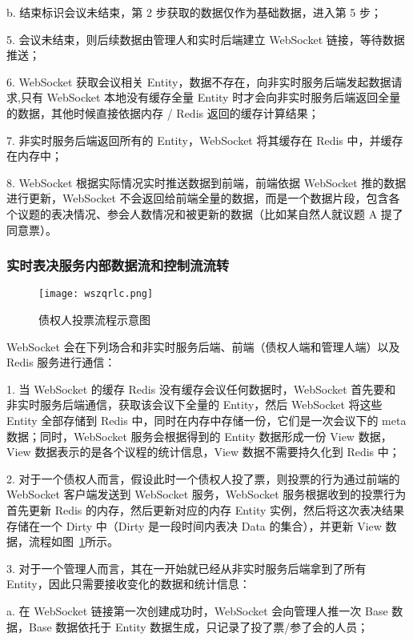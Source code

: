   \quad{}\quad{}b. 结束标识会议未结束，第 2 步获取的数据仅作为基础数据，进入第 5 步；
  
5. 会议未结束，则后续数据由管理人和实时后端建立 WebSocket 链接，等待数据推送；
  
6. WebSocket 获取会议相关 Entity，数据不存在，向非实时服务后端发起数据请求,只有 WebSocket 本地没有缓存全量 Entity 时才会向非实时服务后端返回全量的数据，其他时候直接依据内存 / Redis 返回的缓存计算结果；
  
7. 非实时服务后端返回所有的 Entity，WebSocket 将其缓存在 Redis 中，并缓存在内存中；
  
8. WebSocket 根据实际情况实时推送数据到前端，前端依据 WebSocket 推的数据进行更新，WebSocket 不会返回给前端全量的数据，而是一个数据片段，包含各个议题的表决情况、参会人数情况和被更新的数据（比如某自然人就议题 A 提了同意票）。

  \subsubsection{实时表决服务内部数据流和控制流流转}
  \begin{figure}[!htp]
    \centering
    \texttt{[image: wszqrlc.png]}
    \caption{债权人投票流程示意图}
    \label{fig:wszqrlc}
  \end{figure}

  WebSocket 会在下列场合和非实时服务后端、前端（债权人端和管理人端）以及 Redis 服务进行通信：

  1. 当 WebSocket 的缓存 Redis 没有缓存会议任何数据时，WebSocket 首先要和 非实时服务后端通信，获取该会议下全量的 Entity，然后 WebSocket 将这些 Entity 全部存储到 Redis 中，同时在内存中存储一份，它们是一次会议下的 meta 数据；同时，WebSocket 服务会根据得到的 Entity 数据形成一份 View 数据，View 数据表示的是各个议程的统计信息，View 数据不需要持久化到 Redis 中；
  
  2. 对于一个债权人而言，假设此时一个债权人投了票，则投票的行为通过前端的 WebSocket 客户端发送到 WebSocket 服务，WebSocket 服务根据收到的投票行为首先更新 Redis 的内存，然后更新对应的内存 Entity 实例，然后将这次表决结果存储在一个 Dirty 中（Dirty 是一段时间内表决 Data 的集合），并更新 View 数据，流程如图~\ref{fig:wszqrlc}所示。

  3. 对于一个管理人而言，其在一开始就已经从非实时服务后端拿到了所有 Entity，因此只需要接收变化的数据和统计信息：

  \quad{}\quad{}a. 在 WebSocket 链接第一次创建成功时，WebSocket 会向管理人推一次 Base 数据，Base 数据依托于 Entity 数据生成，只记录了投了票/参了会的人员；

